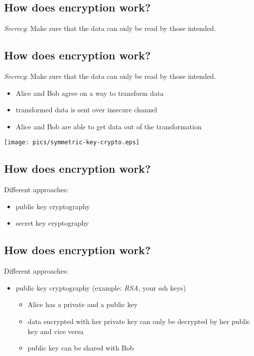 \documentclass[xga]{xdvislides}
\begin{document}
\subsection{How does encryption work?}
{\em Secrecy}:  Make sure that the data can only be read by those intended.

\subsection{How does encryption work?}
{\em Secrecy}:  Make sure that the data can only be read by those intended.
\begin{itemize}
	\item Alice and Bob agree on a way to transform data
	\item transformed data is sent over insecure channel
	\item Alice and Bob are able to get data out of the transformation
\end{itemize}
\addvspace{.5in}
\begin{center}
	\texttt{[image: pics/symmetric-key-crypto.eps]}
\end{center}

\subsection{How does encryption work?}
Different approaches:
\begin{itemize}
	\item public key cryptography
	\item secret key cryptography
\end{itemize}

\subsection{How does encryption work?}
Different approaches:
\begin{itemize}
	\item public key cryptography (example: {\em RSA}, your ssh keys)
		\begin{itemize}
			\item Alice has a private and a public key
			\item data encrypted with her private key can only be decrypted by
				her public key and vice versa
			\item public key can be shared with Bob
		\end{itemize}
\end{itemize}
\end{document}
